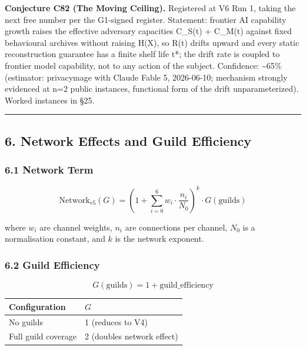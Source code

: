 \documentclass[
]{article}
\newcounter{none} %
\begin{document}
\textbf{Conjecture C82 (The Moving Ceiling).} Registered at V6 Run 1,
taking the next free number per the G1-signed register. Statement:
frontier AI capability growth raises the effective adversary capacities
C\_S(t) + C\_M(t) against fixed behavioural archives without raising
H(X), so R(t) drifts upward and every static reconstruction guarantee
has a finite shelf life t*; the drift rate is coupled to frontier model
capability, not to any action of the subject. Confidence:
\textasciitilde65\% (estimator: privacymage with Claude Fable 5,
2026-06-10; mechanism strongly evidenced at n=2 public instances,
functional form of the drift unparameterized). Worked instances in §25.

\begin{center}\rule{0.5\linewidth}{0.5pt}\end{center}

\subsection{6. Network Effects and Guild
Efficiency}\label{network-effects-and-guild-efficiency}

\subsubsection{6.1 Network Term}\label{network-term}

\[\text{Network}_{v5}(G) = \left(1 + \sum_{i=0}^{6} w_i \cdot \frac{n_i}{N_0}\right)^k \cdot G(\text{guilds})\]

where \(w_i\) are channel weights, \(n_i\) are connections per channel,
\(N_0\) is a normalisation constant, and \(k\) is the network exponent.

\subsubsection{6.2 Guild Efficiency}\label{guild-efficiency}

\[G(\text{guilds}) = 1 + \text{guild\_efficiency}\]

{\def\LTcaptype{none} %
\begin{longtable}[]{@{}ll@{}}
\toprule\noalign{}
Configuration & \(G\) \\
\midrule\noalign{}
\endhead
\bottomrule\noalign{}
\endlastfoot
No guilds & 1 (reduces to V4) \\
Full guild coverage & 2 (doubles network effect) \\
\end{longtable}
}
\end{document}
